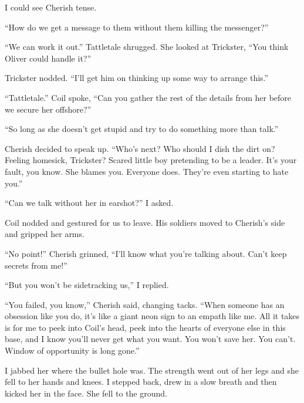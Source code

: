 I could see Cherish tense.



``How do we get a message to them without them killing the messenger?''



``We can work it out.''  Tattletale shrugged.  She looked at Trickster, ``You think Oliver could handle it?''



Trickster nodded. ``I'll get him on thinking up some way to arrange this.''



``Tattletale.'' Coil spoke, ``Can you gather the rest of the details from her before we secure her offshore?''



``So long as she doesn't get stupid and try to do something more than talk.''



Cherish decided to speak up.  ``Who's next?  Who should I dish the dirt on?  Feeling homesick, Trickster?  Scared little boy pretending to be a leader.  It's your fault, you know.  She blames you.  Everyone does. They're even starting to hate you.''



``Can we talk without her in earshot?'' I asked.



Coil nodded and gestured for us to leave.  His soldiers moved to Cherish's side and gripped her arms.



``No point!''  Cherish grinned, ``I'll know what you're talking about.  Can't keep secrets from me!''



``But you won't be sidetracking us,'' I replied.



``You failed, you know,'' Cherish said, changing tacks.  ``When someone has an obsession like you do, it's like a giant neon sign to an empath like me.  All it takes is for me to peek into Coil's head, peek into the hearts of everyone else in this base, and I know you'll never get what you want.  You won't save her.  You can't.  Window of opportunity is long gone.''



I jabbed her where the bullet hole was.  The strength went out of her legs and she fell to her hands and knees.  I stepped back, drew in a slow breath and then kicked her in the face.  She fell to the ground.



